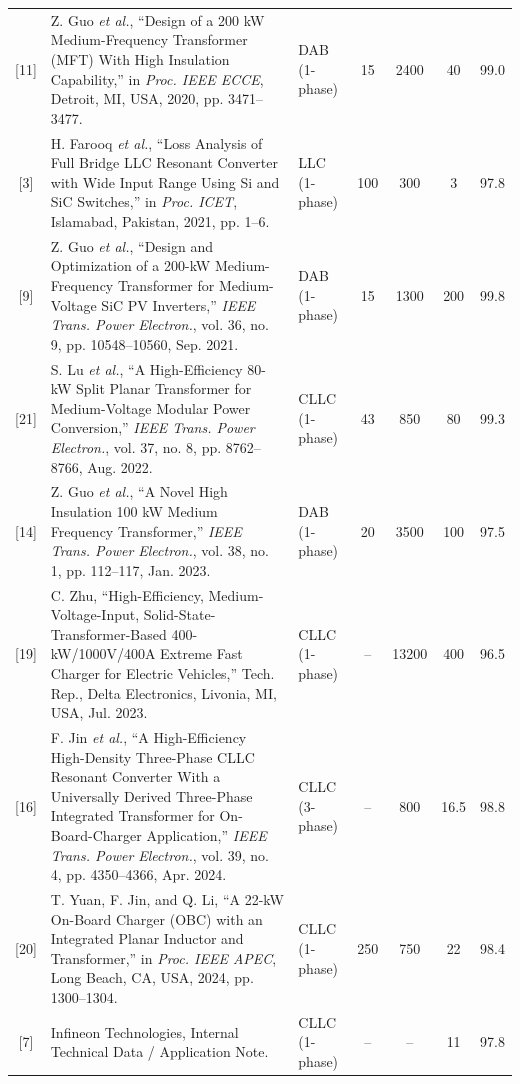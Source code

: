 \begin{longtable}{c p{} l c c c c}
[11] & Z. Guo \textit{et al.}, ``Design of a 200 kW Medium-Frequency Transformer (MFT) With High Insulation Capability,'' in \textit{Proc. IEEE ECCE}, Detroit, MI, USA, 2020, pp. 3471--3477. & DAB (1-phase) & 15 & 2400 & 40 & 99.0 \\

[3] & H. Farooq \textit{et al.}, ``Loss Analysis of Full Bridge LLC Resonant Converter with Wide Input Range Using Si and SiC Switches,'' in \textit{Proc. ICET}, Islamabad, Pakistan, 2021, pp. 1--6. & LLC (1-phase) & 100 & 300 & 3 & 97.8 \\

[9] & Z. Guo \textit{et al.}, ``Design and Optimization of a 200-kW Medium-Frequency Transformer for Medium-Voltage SiC PV Inverters,'' \textit{IEEE Trans. Power Electron.}, vol. 36, no. 9, pp. 10548--10560, Sep. 2021. & DAB (1-phase) & 15 & 1300 & 200 & 99.8 \\

[21] & S. Lu \textit{et al.}, ``A High-Efficiency 80-kW Split Planar Transformer for Medium-Voltage Modular Power Conversion,'' \textit{IEEE Trans. Power Electron.}, vol. 37, no. 8, pp. 8762--8766, Aug. 2022. & CLLC (1-phase) & 43 & 850 & 80 & 99.3 \\

[14] & Z. Guo \textit{et al.}, ``A Novel High Insulation 100 kW Medium Frequency Transformer,'' \textit{IEEE Trans. Power Electron.}, vol. 38, no. 1, pp. 112--117, Jan. 2023. & DAB (1-phase) & 20 & 3500 & 100 & 97.5 \\

[19] & C. Zhu, ``High-Efficiency, Medium-Voltage-Input, Solid-State-Transformer-Based 400-kW/1000V/400A Extreme Fast Charger for Electric Vehicles,'' Tech. Rep., Delta Electronics, Livonia, MI, USA, Jul. 2023. & CLLC (1-phase) & -- & 13200 & 400 & 96.5 \\

[16] & F. Jin \textit{et al.}, ``A High-Efficiency High-Density Three-Phase CLLC Resonant Converter With a Universally Derived Three-Phase Integrated Transformer for On-Board-Charger Application,'' \textit{IEEE Trans. Power Electron.}, vol. 39, no. 4, pp. 4350--4366, Apr. 2024. & CLLC (3-phase) & -- & 800 & 16.5 & 98.8 \\

[20] & T. Yuan, F. Jin, and Q. Li, ``A 22-kW On-Board Charger (OBC) with an Integrated Planar Inductor and Transformer,'' in \textit{Proc. IEEE APEC}, Long Beach, CA, USA, 2024, pp. 1300--1304. & CLLC (1-phase) & 250 & 750 & 22 & 98.4 \\

[7] & Infineon Technologies, Internal Technical Data / Application Note. & CLLC (1-phase) & -- & -- & 11 & 97.8 \\

\end{longtable}
\endgroup